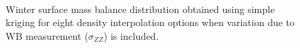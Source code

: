 \documentclass{sfuthesis}
\begin{document}
{\begin{appendices}
\begin{figure}
	\centering
	\\
	\caption[]{Winter surface mass balance distribution obtained using simple kriging for eight density interpolation options when variation due to WB measurement ($\sigma_{ZZ}$) is included. }
	\label{fig:WSMB_SK_Distributionzz}
\end{figure}
\begin{figure}
	\centering
	\\

\end{figure}
\end{appendices}}
\end{document}
